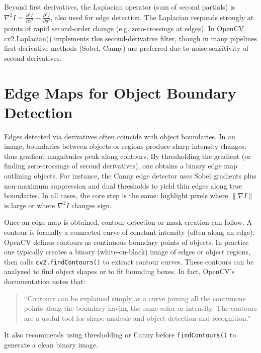 \documentclass[12pt]{article}
\begin{document}
Beyond first derivatives, the Laplacian operator (sum of second partials) is \( \nabla^2 I = \frac{\partial^2 I}{\partial x^2} + \frac{\partial^2 I}{\partial y^2} \), also used for edge detection. The Laplacian responds strongly at points of rapid second-order change (e.g. zero-crossings at edges). In OpenCV, cv2.Laplacian() implements this second-derivative filter,
though in many pipelines first-derivative methods (Sobel, Canny) are preferred due to noise sensitivity of second derivatives.

\section{Edge Maps for Object Boundary Detection}
Edges detected via derivatives often coincide with object boundaries. In an image, boundaries between objects or regions produce sharp intensity changes; thus gradient magnitudes peak along contours. By thresholding the gradient (or finding zero-crossings of second derivatives), one obtains a binary edge map outlining objects. For instance, the Canny edge detector uses Sobel gradients plus non-maximum suppression and dual thresholds to yield thin edges along true boundaries. In all cases, the core step is the same: highlight pixels where $\|\nabla I\|$ is large or where $\nabla^2 I$ changes sign.

Once an edge map is obtained, contour detection or mask creation can follow. A contour is formally a connected curve of constant intensity (often along an edge). OpenCV defines contours as continuous boundary points of objects. In practice one typically creates a binary (white-on-black) image of edges or object regions, then calls \texttt{cv2.findContours()} to extract contour curves. These contours can be analyzed to find object shapes or to fit bounding boxes. In fact, OpenCV’s documentation notes that:

\begin{quote}
“Contours can be explained simply as a curve joining all the continuous points along the boundary having the same color or intensity. The contours are a useful tool for shape analysis and object detection and recognition.”
\end{quote}

It also recommends using thresholding or Canny before \texttt{findContours()} to generate a clean binary image.
\end{document}
